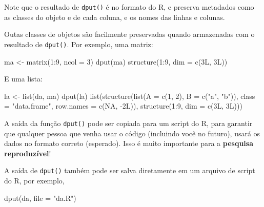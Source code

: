 \documentclass[
  10pt,
  a4paper]{book}
\newenvironment{Shaded}{\begin{snugshade}}{\end{snugshade}}
\newcommand{\AttributeTok}[1]{\textcolor[rgb]{0.77,0.63,0.00}{#1}}
\newcommand{\ConstantTok}[1]{\textcolor[rgb]{0.00,0.00,0.00}{#1}}
\newcommand{\DecValTok}[1]{\textcolor[rgb]{0.00,0.00,0.81}{#1}}
\newcommand{\FunctionTok}[1]{\textcolor[rgb]{0.00,0.00,0.00}{#1}}
\newcommand{\NormalTok}[1]{#1}
\newcommand{\OtherTok}[1]{\textcolor[rgb]{0.56,0.35,0.01}{#1}}
\newcommand{\SpecialCharTok}[1]{\textcolor[rgb]{0.00,0.00,0.00}{#1}}
\newcommand{\StringTok}[1]{\textcolor[rgb]{0.31,0.60,0.02}{#1}}
\begin{document}
Note que o resultado de \texttt{dput()} é no formato do R, e preserva metadados
como as classes do objeto e de cada coluna, e os nomes das linhas e
colunas.

Outas classes de objetos são facilmente preservadas quando armazenadas
com o resultado de \texttt{dput()}. Por exemplo, uma matriz:

\begin{Shaded}
\begin{Highlighting}[]
\NormalTok{ma }\OtherTok{\textless{}{-}} \FunctionTok{matrix}\NormalTok{(}\DecValTok{1}\SpecialCharTok{:}\DecValTok{9}\NormalTok{, }\AttributeTok{ncol =} \DecValTok{3}\NormalTok{)}
\FunctionTok{dput}\NormalTok{(ma)}
\FunctionTok{structure}\NormalTok{(}\DecValTok{1}\SpecialCharTok{:}\DecValTok{9}\NormalTok{, }\AttributeTok{dim =} \FunctionTok{c}\NormalTok{(3L, 3L))}
\end{Highlighting}
\end{Shaded}

E uma lista:

\begin{Shaded}
\begin{Highlighting}[]
\NormalTok{la }\OtherTok{\textless{}{-}} \FunctionTok{list}\NormalTok{(da, ma)}
\FunctionTok{dput}\NormalTok{(la)}
\FunctionTok{list}\NormalTok{(}\FunctionTok{structure}\NormalTok{(}\FunctionTok{list}\NormalTok{(}\AttributeTok{A =} \FunctionTok{c}\NormalTok{(}\DecValTok{1}\NormalTok{, }\DecValTok{2}\NormalTok{), }\AttributeTok{B =} \FunctionTok{c}\NormalTok{(}\StringTok{"a"}\NormalTok{, }\StringTok{"b"}\NormalTok{)), }\AttributeTok{class =} \StringTok{"data.frame"}\NormalTok{, }\AttributeTok{row.names =} \FunctionTok{c}\NormalTok{(}\ConstantTok{NA}\NormalTok{, }
\SpecialCharTok{{-}}\NormalTok{2L)), }\FunctionTok{structure}\NormalTok{(}\DecValTok{1}\SpecialCharTok{:}\DecValTok{9}\NormalTok{, }\AttributeTok{dim =} \FunctionTok{c}\NormalTok{(3L, 3L)))}
\end{Highlighting}
\end{Shaded}

A saída da função \texttt{dput()} pode ser copiada para um script do R, para
garantir que qualquer pessoa que venha usar o código (incluindo você no
futuro), usará os dados no formato correto (esperado). Isso é muito
importante para a \textbf{pesquisa reproduzível}!

A saída de \texttt{dput()} também pode ser salva diretamente em um arquivo de
script do R, por exemplo,

\begin{Shaded}
\begin{Highlighting}[]
\FunctionTok{dput}\NormalTok{(da, }\AttributeTok{file =} \StringTok{"da.R"}\NormalTok{)}
\end{Highlighting}
\end{Shaded}
\end{document}

